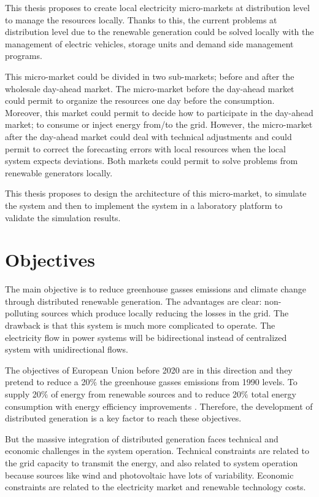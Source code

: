 \documentclass[a4paper,11pt,twoside,openright]{report}
\begin{document}
This thesis proposes to create local electricity micro-markets at distribution level to manage the resources locally. Thanks to this, the current problems at distribution level due to the renewable generation could be solved locally with the management of electric vehicles, storage units and demand side management programs.

This micro-market could be divided in two sub-markets; before and after the wholesale day-ahead market.
The micro-market before the day-ahead market could permit to organize the resources one day before the consumption. Moreover, this market could permit to decide how to participate in the day-ahead market; to consume or inject energy from/to the grid.
However, the micro-market after the day-ahead market could deal with technical adjustments and could permit to correct the forecasting errors with local resources when the local system expects deviations. Both markets could permit to solve problems from renewable generators locally.

This thesis proposes to design the architecture of this micro-market, to simulate the system and then to implement the system in a laboratory platform to validate the simulation results.

\chapter{Objectives}
\label{cap:objectives}
The main objective is to reduce greenhouse gasses emissions and climate change through distributed renewable generation. 
The advantages are clear: non-polluting sources which produce locally reducing the losses in the grid. 
The drawback is that this system is much more complicated to operate. The electricity flow in power systems will be bidirectional instead of centralized system with unidirectional flows.

The objectives of European Union before 2020 are in this direction and they pretend to reduce a 20$\%$ the greenhouse gasses emissions from 1990 levels. To supply 20$\%$ of energy from renewable sources \cite{Directiva_renovables} and to reduce 20$\%$ total energy consumption with energy efficiency improvements \cite{Directiva_eficiencia}. Therefore, the development of distributed generation is a key factor to reach these objectives.

But the massive integration of distributed generation faces technical and economic challenges in the system operation. 
Technical constraints are related to the grid capacity to transmit the energy, and also related to system operation because sources like wind and photovoltaic have lots of variability. 
Economic constraints are related to the electricity market and renewable technology costs.
\end{document}
